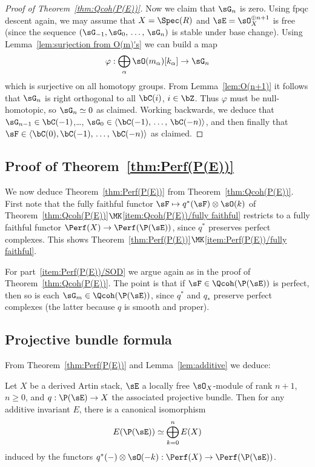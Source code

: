 \begin{proof}[Proof of Theorem~\ref{thm:Qcoh(P(E))}]
Now we claim that $\sG_n$ is zero. Using fpqc descent again, we may assume that $X = \Spec(R)$ and $\sE = \sO^{\oplus n+1}_X$ is free (since the sequence $(\sG_{-1},\sG_0,\,\ldots,\,\sG_n)$ is stable under base change). Using Lemma~\ref{lem:surjection from O(m)'s} we can build a map
\[
\varphi : \bigoplus_\alpha \sO(m_\alpha)[k_\alpha] \to \sG_n
\]
which is surjective on all homotopy groups. From Lemma~\ref{lem:O(n+1)} it follows that $\sG_n$ is right orthogonal to all $\bC(i)$, $i\in\bZ$. Thus $\varphi$ must be null-homotopic, so $\sG_n \simeq 0$ as claimed. Working backwards, we deduce that $\sG_{n-1} \in \bC(-1)$,\dots, $\sG_0 \in \langle \bC(-1),\,\ldots,\,\bC(-n)\rangle$, and then finally that $\sF \in \langle \bC(0), \bC(-1),\,\ldots,\,\bC(-n)\rangle$ as claimed.
\end{proof}

\subsection{Proof of Theorem~\ref{thm:Perf(P(E))}}\label{ssec:proof of Perf(P(E))}

We now deduce Theorem~\ref{thm:Perf(P(E))} from Theorem~\ref{thm:Qcoh(P(E))}. First note that the fully faithful functor $\sF \mapsto q^*(\sF)\otimes\sO(k)$ of Theorem~\ref{thm:Qcoh(P(E))}$\MK$\eqref{item:Qcoh(P(E))/fully faithful} restricts to a fully faithful functor $\Perf(X) \to \Perf(\P(\sE))$, since $q^*$ preserves perfect complexes. This shows Theorem~\ref{thm:Perf(P(E))}$\MK$\eqref{item:Perf(P(E))/fully faithful}.

For part~\eqref{item:Perf(P(E))/SOD} we argue again as in the proof of Theorem~\ref{thm:Qcoh(P(E))}. The point is that if $\sF \in \Qcoh(\P(\sE))$ is perfect, then so is each $\sG_m \in \Qcoh(\P(\sE))$, since $q^*$ and $q_*$ preserve perfect complexes (the latter because $q$ is smooth and proper).

\subsection{Projective bundle formula}

From Theorem~\ref{thm:Perf(P(E))} and Lemma~\ref{lem:additive} we deduce:

\begin{coro}\label{cor:E(P(E))}
Let $X$ be a derived Artin stack, $\sE$ a locally free $\sO_X$-module of rank $n+1$, $n\ge 0$, and $q : \P(\sE) \to X$ the associated projective bundle. Then for any additive invariant $E$, there is a canonical isomorphism
\[
E(\P(\sE)) \simeq \bigoplus_{k=0}^{n} E(X)
\]
induced by the functors $q^*(-)\otimes \sO(-k) : \Perf(X) \to \Perf(\P(\sE))$.
\end{coro}

